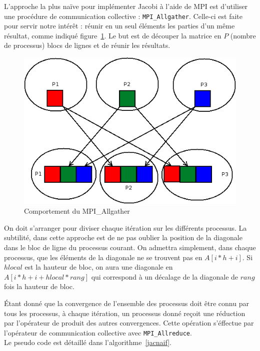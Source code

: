 \documentclass[a4paper]{article}
\begin{document}
L'approche la plus naïve pour implémenter Jacobi à l'aide de MPI est
d'utiliser une procédure de communication collective
: \texttt{MPI\_Allgather}. Celle-ci est faite pour servir notre
intérêt : réunir en un seul éléments les parties d'un même résultat,
comme indiqué figure~\ref{allgather}. Le but est de découper la
matrice en $P$ (nombre de processus) blocs de lignes et de réunir les
résultats.


\begin{figure}
\centering
\includegraphics[scale=0.4]{allgather.png}
\caption{\label{allgather}Comportement du MPI\_Allgather}
\end{figure}

On doit s'arranger pour diviser chaque itération sur les différents
processus. La subtilité, dans cette approche est de ne pas oublier la
position de la diagonale dans le bloc de ligne du processus courant.
On admettra simplement, dans chaque processus, que les éléments de la
diagonale ne se trouvent pas en $A[i * h + i] $. Si $hlocal$ est la
hauteur de bloc, on aura une diagonale en $A[i * h + i + hlocal *
rang]$ qui correspond à un décalage de la diagonale de $rang$ fois la
hauteur de bloc.

Étant donné que la convergence de l'ensemble des processus doit être connu
par tous les processus, à chaque itération, un processus donné reçoit une
réduction par l'opérateur de produit des autres convergences. Cette opération
s'éffectue par l'opérateur de communication collective avec 
\texttt{MPI\_Allreduce}.\\

Le pseudo code est détaillé dans l'algorithme~\ref{jacnaif}.
\end{document}
